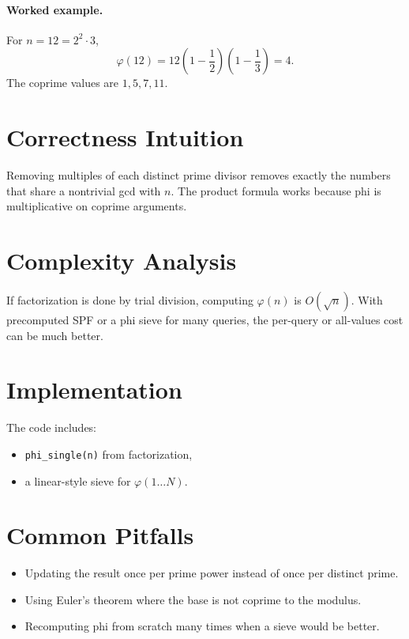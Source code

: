 \paragraph{Worked example.}
For \(n = 12 = 2^2 \cdot 3\),
\[
\varphi(12) = 12\left(1 - \frac{1}{2}\right)\left(1 - \frac{1}{3}\right) = 4.
\]
The coprime values are \(1, 5, 7, 11\).

\section*{Correctness Intuition}

Removing multiples of each distinct prime divisor removes exactly the numbers that share a nontrivial gcd with \(n\).
The product formula works because phi is multiplicative on coprime arguments.

\section*{Complexity Analysis}

If factorization is done by trial division, computing \(\varphi(n)\) is \(O(\sqrt{n})\). With precomputed SPF or a phi
sieve for many queries, the per-query or all-values cost can be much better.

\section*{Implementation}

The code includes:

\begin{itemize}
  \item \texttt{phi\_single(n)} from factorization,
  \item a linear-style sieve for \(\varphi(1 \dots N)\).
\end{itemize}

\section*{Common Pitfalls}

\begin{itemize}
  \item Updating the result once per prime power instead of once per distinct prime.
  \item Using Euler's theorem where the base is not coprime to the modulus.
  \item Recomputing phi from scratch many times when a sieve would be better.
\end{itemize}

